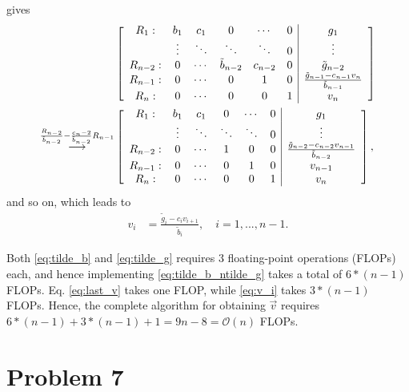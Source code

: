 \documentclass[english,notitlepage,reprint,nofootinbib]{revtex4-2}  %
\begin{document}
\begin{widetext}
gives 
\begin{align}
    &\left[\begin{array}{cccccc|c}
        R_1: & b_1 & c_1 & 0 & \cdots & 0  & g_1\\
        \ & \vdots & \ddots & \ddots & \ddots & 0  & \vdots \\
        R_{n-2}:   & 0 & \cdots & \tilde{b}_{n-2} & c_{n-2} & 0 & \tilde{g}_{n-2} \\
        R_{n-1}: & 0 & \cdots & 0 & 1 & 0 & \frac{\tilde{g}_{n-1} - c_{n-1}v_{n}}{\tilde{b}_{n-1}} \\
        R_{n}: & 0 & \cdots & 0 & 0 & 1 & v_{n}
    \end{array}\right]
    \notag \\
    \overset{\frac{R_{n-2}}{\tilde{b}_{n-2}}-\frac{c_n-2}{\tilde{b}_{n-2}}R_{n-1}}{\longrightarrow} 
    &\left[\begin{array}{cccccc|c}
        R_1: & b_1 & c_1 & 0 & \cdots & 0  & g_1\\
        \ & \vdots & \ddots & \ddots & \ddots & 0  & \vdots \\
        R_{n-2}:   & 0 & \cdots & 1 & 0 & 0 & \frac{\tilde{g}_{n-2} - c_{n-2}v_{n-1}}{\tilde{b}_{n-2}} \\
        R_{n-1}: & 0 & \cdots & 0 & 1 & 0 & v_{n-1} \\
        R_{n}: & 0 & \cdots & 0 & 0 & 1 & v_{n}
    \end{array}\right],
\end{align}
and so on, which leads to  
\begin{align}
    v_{i}   &= \frac{\tilde{g}_{i}-c_{i}v_{i+1}}{\tilde{b}_{i}}, \quad i=1, ..., n-1.   \label{eq:v_i}
\end{align}
\end{widetext}

Both \eqref{eq:tilde_b} and \eqref{eq:tilde_g} requires \(3\) floating-point operations (FLOPs) each, and hence implementing \eqref{eq:tilde_b_ntilde_g} takes a total of \(6*(n-1)\) FLOPs. Eq. \eqref{eq:last_v} takes one FLOP, while \eqref{eq:v_i} takes \(3*(n-1)\) FLOPs. Hence, the complete algorithm for obtaining \(\vec{v}\) requires \({6*(n-1) + 3*(n-1) + 1= 9n-8=\mathcal{O}(n)}\) FLOPs.

\section{Problem 7}


\onecolumngrid
% 


\end{document}
